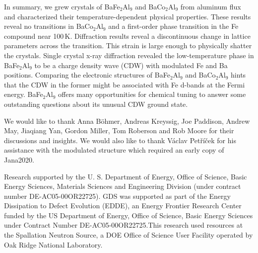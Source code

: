 \documentclass[journal=cmatex,manuscript=article]{achemso}
\begin{document}
In summary, we grew crystals of BaFe$_2$Al$_9$ and BaCo$_2$Al$_9$ from aluminum flux and characterized their temperature-dependent physical properties. These results reveal no transitions in BaCo$_2$Al$_9$ and a first-order phase transition in the Fe compound near 100\,K. Diffraction results reveal a discontinuous change in lattice parameters across the transition. This strain is large enough to physically shatter the crystals. Single crystal x-ray diffraction revealed the low-temperature phase in BaFe$_2$Al$_9$ to be a charge density wave (CDW) with modulated Fe and Ba positions. Comparing the electronic structures of BaFe$_2$Al$_9$ and BaCo$_2$Al$_9$ hints that the CDW in the former might be associated with Fe d-bands at the Fermi energy. BaFe$_2$Al$_9$ offers many opportunities for chemical tuning to answer some outstanding questions about its unusual CDW ground state.

\begin{acknowledgement}
	\label{sec:Acknowledgment}
	
	We would like to thank Anna B\"ohmer, Andreas Kreyssig, Joe Paddison, Andrew May, Jiaqiang Yan, Gordon Miller, Tom Roberson and Rob Moore for their discussions and insights. We would also like to thank V\'aclav Pet\v{r}\'i\v{c}ek for his assistance with the modulated structure which required an early copy of Jana2020.
	
	Research supported by the U. S. Department of Energy, Office of Science, Basic Energy Sciences, Materials Sciences and Engineering Division (under contract number DE-AC05-00OR22725). GDS was supported as part of the Energy Dissipation to Defect Evolution (EDDE), an Energy Frontier Research Center funded by the US Department of Energy, Office of Science, Basic Energy Sciences under Contract Number DE-AC05-00OR22725.This research used resources at the Spallation Neutron Source, a DOE Office of Science User Facility operated by Oak Ridge National Laboratory.

\end{acknowledgement}
\end{document}
